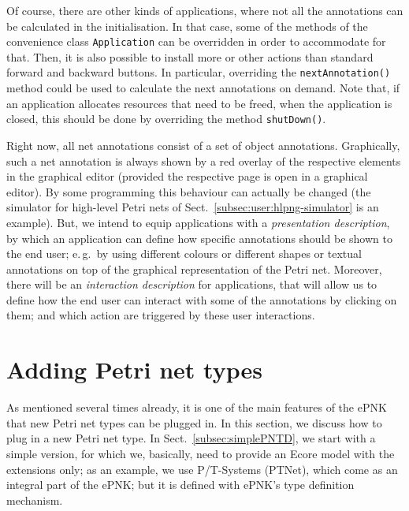 Of course, there are other kinds of applications, where not all the annotations
can be calculated in the initialisation. In that case, some of the methods of
the convenience class {\tt Application} can be overridden in order to
accommodate for that. Then, it is also possible to install more or other actions
than standard forward and backward buttons. In particular, overriding the
{\tt nextAnnotation()} method could be used to calculate the next annotations on
demand. Note that, if an application allocates resources that need to be freed,
when the application is closed, this should be done by overriding the method
{\tt shutDown()}.%

Right now, all net annotations consist of a set of object annotations.
Graphically, such a net annotation is always shown by a red overlay of the respective
elements in the graphical editor (provided the respective page is open in a
graphical editor).
By some programming this behaviour can actually be changed (the simulator for
high-level Petri nets of Sect.~\ref{subsec:user:hlpng-simulator} is an example). But, we intend
to equip applications with a \emph{presentation description},%
by which an application can define how specific annotations should be shown to
the end user; e.\,g.\ by using different colours or different shapes or textual
annotations on top of the graphical representation of the Petri net. Moreover,
there will be an \emph{interaction description}%
for applications, that will allow us to define how the end user can interact
with some of the annotations by clicking on them; and which action are
triggered by these user interactions.

\section{Adding Petri net types}  
\label{sec:adding-types}

As mentioned several times already, it is one of the main features of the ePNK
that new Petri net types can be plugged in. In this section, we discuss how to
plug in a new Petri net type.  In Sect.~\ref{subsec:simplePNTD}, we start with a
simple version, for which we, basically, need to provide an Ecore model with
the extensions only; as an example, we use P/T-Systems (PTNet), which come as an
integral part of the ePNK; but it is defined with ePNK's type definition
mechanism.

